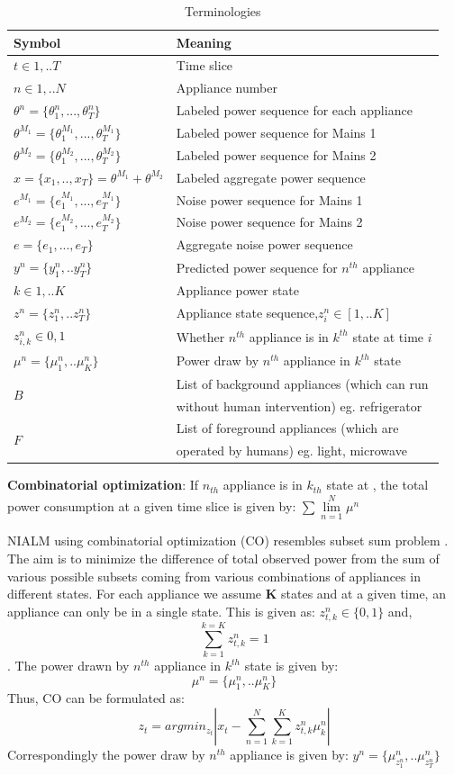 \documentclass[conference]{IEEEtran}
\begin{document}
\begin{table}
\caption{Terminologies}
\label{tab:terms}
\begin{tabular}{|l|l|}
\hline
Symbol&Meaning\\
\hline
$t\in {1,..T}$& Time slice\\
$n\in{1,..N}$ & Appliance number\\
$\theta^n=\{\theta_1^n,...,\theta_T^n\}$ & Labeled power sequence for each appliance\\
$\theta^{M_1}=\{\theta_1^{M_1},...,\theta_T^{M_1}\}$ & Labeled power sequence for Mains 1\\
$\theta^{M_2}=\{\theta_1^{M_2},...,\theta_T^{M_2}\}$ & Labeled power sequence for Mains 2\\
$x=\{ x_1,..,x_T\}=\theta^{M_1}+\theta^{M_2}$ & Labeled aggregate power sequence\\
$e^{M_1}=\{e_1^{M_1},...,e_T^{M_1}\}$ & Noise power sequence for Mains 1\\
$e^{M_2}=\{e_1^{M_2},...,e_T^{M_2}\}$ & Noise power sequence for Mains 2\\
$e=\{e_1,...,e_T\}$ & Aggregate noise power sequence\\
$y^n=\{y_1^n,..y_T^n\}$ & Predicted power sequence for $n^{th}$ appliance\\
$k\in {1,..K}$ & Appliance power state\\
$z^n=\{z_1^n,..z_T^n\}$ & Appliance state sequence,$z_i^n \in [1,..K]$\\
$z_{i,k}^n \in{0,1}$ & Whether $n^{th}$ appliance is in $k^{th}$ state at time $i$\\
$\mu^n=\{\mu_1^n,..\mu_K^n\}$ & Power draw by $n^{th}$ appliance in $k^{th}$ state\\
\multirow{2}{*}{$B$} & List of background appliances (which can run\\
 					 &without human intervention) eg. refrigerator\\
\multirow{2}{*}{$F$} & List of foreground appliances (which are \\ 
 					 &operated by humans) eg. light, microwave\\
\hline
%
\end{tabular}
\end{table}

\textbf{Combinatorial optimization}: If $n_{th}$ appliance is in $k_{th}$ state at , the total power consumption at a given time slice is given by:
$\sum\lim\limits_{n=1}^{N}\mu^n$
		

NIALM using combinatorial optimization (CO) resembles subset sum problem \cite{knapsack}. 
The aim is to minimize the difference of total observed power from the sum of various possible subsets coming from various combinations of appliances in different states. For each appliance we assume \textbf{K} states and at a given time, an appliance can only be in a single state. This is given as: 
$z_{t,k}^n\in\{0,1\} $ and, $$\sum\limits_{k=1}^{k=K} z_{t,k}^n=1$$. The power drawn by $n^{th}$ appliance in $k^{th}$ state is given by:
$$\mu^n=\{\mu_1^n,..\mu_K^n\}$$ Thus, CO can be formulated as:
$$z_t=arg min_{z_t}|x_t-\sum\limits_{n=1}^{N}\sum\limits_{k=1}^{K}z_{t,k}^n\mu_k^n|$$
Correspondingly the power draw by $n^{th}$ appliance is given by: $y^n=\{\mu_{z_1^n}^n,..\mu_{z_T^n}^n \}$
\end{document}
